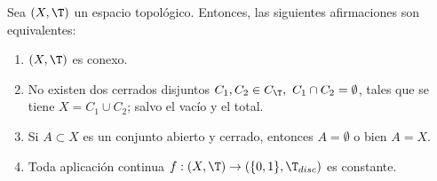 \begin{prop}
    Sea $(X,\T)$ un espacio topológico. Entonces, las siguientes afirmaciones son equivalentes:
    \begin{enumerate}
        \item $(X,\T)$ es conexo.
        \item No existen dos cerrados disjuntos $C_1,C_2\in C_{\T},~C_1\cap C_2=\emptyset$, tales que se tiene $X=C_1\cup C_2$; salvo el vacío y el total.
        \item Si $A\subset X$ es un conjunto abierto y cerrado, entonces $A=\emptyset$ o bien $A=X$.
        \item Toda aplicación continua $f:(X,\T)\to \left(\{0,1\},\T_{disc}\right)$ es constante.
    \end{enumerate}
\end{prop}
